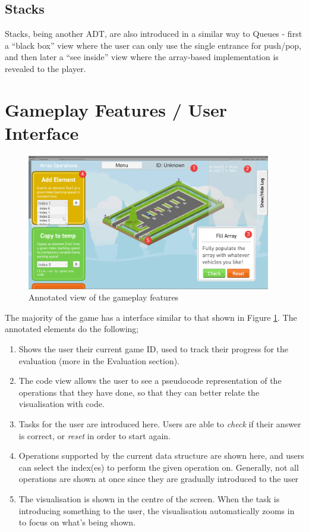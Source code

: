 \documentclass[11pt]{article}
\begin{document}
\subsection{Stacks}
Stacks, being another ADT, are also introduced in a similar way to Queues - first a ``black box'' view where the user can only use the single entrance for push/pop, and then later a ``see inside'' view where the array-based implementation is revealed to the player.
\section{Gameplay Features / User Interface}
\begin{figure}
  \centering
  \includegraphics[width=0.95\textwidth]{images/annotatedelements.png}
\caption{Annotated view of the gameplay features}
\label{fig:annotatedelements}
\end{figure}
The majority of the game has a interface similar to that shown in Figure \ref{fig:annotatedelements}. The annotated elements do the following;
\begin{spacing}{1.5}
\begin{enumerate}
  \item Shows the user their current game ID, used to track their progress for the evaluation (more in the Evaluation section).
  \item The code view allows the user to see a pseudocode representation of the operations that they have done, so that they can better relate the visualisation with code.
  \item Tasks for the user are introduced here. Users are able to \emph{check} if their answer is correct, or \emph{reset} in order to start again.
  \item Operations supported by the current data structure are shown here, and users can select the index(es) to perform the given operation on. Generally, not all operations are shown at once since they are gradually introduced to the user
  \item The visualisation is shown in the centre of the screen. When the task is introducing something to the user, the visualisation automatically zooms in to focus on what's being shown.
\end{enumerate}
\end{spacing}
\end{document}
